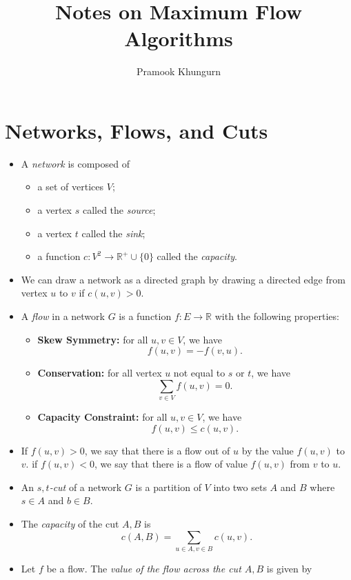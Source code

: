 \documentclass[10pt]{article}
\title{Notes on Maximum Flow Algorithms}
\author{Pramook Khungurn}
\begin{document}
  \maketitle
  \section{Networks, Flows, and Cuts} %
  \label{sec:networks_and_flows}
    \begin{itemize}
      \item A \emph{network} is composed of
        \begin{itemize}
          \item a set of vertices $V$;
          \item a vertex $s$ called the \emph{source};
          \item a vertex $t$ called the \emph{sink};
          \item a function $c: V^2 \rightarrow \mathbb{R}^{+} \cup \{ 0 \}$ called
            the \emph{capacity}.
        \end{itemize}
      \item We can draw a network as a directed graph by drawing a
        directed edge from vertex $u$ to $v$ if $c(u,v) > 0$.
      \item A \emph{flow} in a network $G$ is a function $f: E \rightarrow \mathbb{R}$ 
        with the following properties:
        \begin{itemize}
          \item {\bf Skew Symmetry:} for all $u,v \in V$, we have $$f(u,v) = -f(v,u).$$
          \item {\bf Conservation:} for all vertex $u$ not equal to $s$ or $t$, we have $$\sum_{v \in V} f(u,v) = 0.$$
          \item {\bf Capacity Constraint:} for all $u, v \in V$, we have $$f(u,v) \leq c(u,v).$$
        \end{itemize}
      \item If $f(u,v) > 0$, we say that there is a flow out of $u$ by the value $f(u,v)$ to $v$.
        if $f(u,v) < 0$, we say that there is a flow of value $f(u,v)$ from $v$ to $u$.
      \item An \emph{$s,t$-cut} of a network $G$ is a partition of $V$ 
        into two sets $A$ and $B$ where $s \in A$ and $b \in B$.
      \item The \emph{capacity} of the cut $A,B$ is $$c(A,B) = \sum_{u \in A, v \in B} c(u,v).$$
      \item Let $f$ be a flow. The \emph{value of the flow across the cut $A,B$} is given by

\end{itemize}
\end{document}
